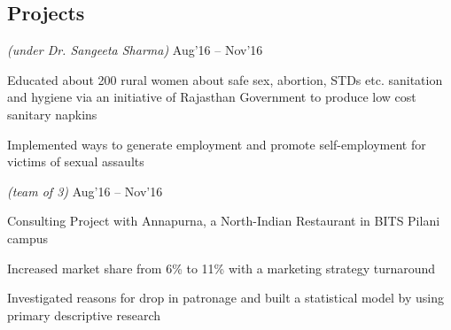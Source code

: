 \documentclass[]{deedy-resume-openfont}
\begin{document}
\begin{minipage}[t]{0.66\textwidth}

\subsection{Projects}

\emph{(under Dr. Sangeeta Sharma)} \hfill Aug'16 -- Nov'16\\
\begin{tightemize}
\item Educated about 200 rural women about safe sex, abortion, STDs etc. sanitation and hygiene via an initiative of Rajasthan Government to produce low cost sanitary napkins
\item Implemented ways to generate employment and promote self-employment for victims of sexual assaults
\end{tightemize}
\vspace{0.2em}

 \emph{(team of 3)} \hfill Aug'16 -- Nov'16\\
\begin{tightemize}
\item Consulting Project with Annapurna, a North-Indian Restaurant in BITS Pilani campus 
\item Increased market share from 6\% to 11\% with a marketing strategy turnaround
\item Investigated reasons for drop in patronage and built a statistical model by using primary descriptive research
\end{tightemize}




\end{minipage}
\end{document}
